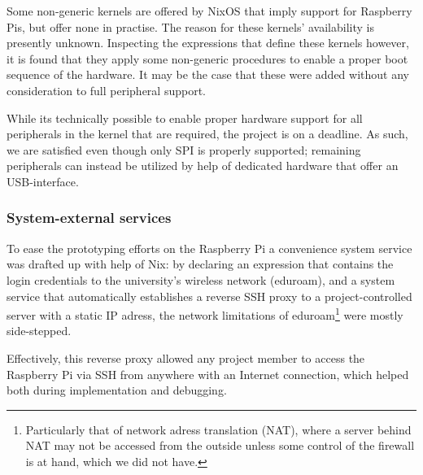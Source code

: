 Some non-generic kernels are offered by NixOS that imply support for Raspberry Pis, but offer none in practise.
The reason for these kernels' availability is presently unknown.
Inspecting the expressions that define these kernels however, it is found that they apply some non-generic procedures to enable a proper boot sequence of the hardware.
It may be the case that these were added without any consideration to full peripheral support.

While its technically possible to enable proper hardware support for all peripherals in the kernel that are required,
the project is on a deadline.
As such, we are satisfied even though only SPI is properly supported;
remaining peripherals can instead be utilized by help of dedicated hardware that offer an USB-interface.

\subsubsection{System-external services}
To ease the prototyping efforts on the Raspberry Pi a convenience system service was drafted up with help of Nix:
by declaring an expression that contains the login credentials to the university's wireless network (eduroam),
and a system service that automatically establishes a reverse SSH proxy to a project-controlled server with a static IP adress,
the network limitations of eduroam\footnote{Particularly that of network adress translation (NAT), where a server behind NAT may not be accessed from the outside unless some control of the firewall is at hand, which we did not have.} were mostly side-stepped.

Effectively, this reverse proxy allowed any project member to access the Raspberry Pi via SSH from anywhere with an Internet connection,
which helped both during implementation and debugging.


